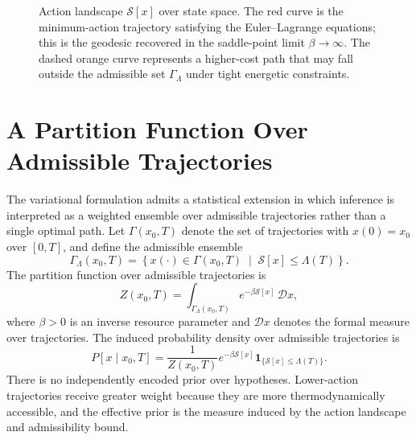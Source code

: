 \documentclass[12pt]{article}
\theoremstyle{plain}
\theoremstyle{definition}
\theoremstyle{remark}
\begin{document}
\begin{figure}[h]
\centering
{}
\caption{Action landscape $\mathcal{S}[x]$ over state space. The red curve is the minimum-action trajectory satisfying the Euler--Lagrange equations; this is the geodesic recovered in the saddle-point limit $\beta \to \infty$. The dashed orange curve represents a higher-cost path that may fall outside the admissible set $\Gamma_\Lambda$ under tight energetic constraints.}
\label{fig:actionlandscape}
\end{figure}

\section{A Partition Function Over Admissible Trajectories}

The variational formulation admits a statistical extension in which inference is interpreted as a weighted ensemble over admissible trajectories rather than a single optimal path. Let $\Gamma(x_0,T)$ denote the set of trajectories with $x(0)=x_0$ over $[0,T]$, and define the admissible ensemble
\[
\Gamma_{\Lambda}(x_0,T) = \left\{ x(\cdot)\in\Gamma(x_0,T) \;\middle|\; \mathcal{S}[x]\leq \Lambda(T) \right\}.
\]
The partition function over admissible trajectories is
\[
Z(x_0,T) = \int_{\Gamma_{\Lambda}(x_0,T)} e^{-\beta \mathcal{S}[x]} \,\mathcal{D}x,
\]
where $\beta > 0$ is an inverse resource parameter and $\mathcal{D}x$ denotes the formal measure over trajectories. The induced probability density over admissible trajectories is
\[
P[x \mid x_0,T] = \frac{1}{Z(x_0,T)} e^{-\beta \mathcal{S}[x]} \mathbf{1}_{\{\mathcal{S}[x]\leq \Lambda(T)\}}.
\]
There is no independently encoded prior over hypotheses. Lower-action trajectories receive greater weight because they are more thermodynamically accessible, and the effective prior is the measure induced by the action landscape and admissibility bound.
\end{document}
